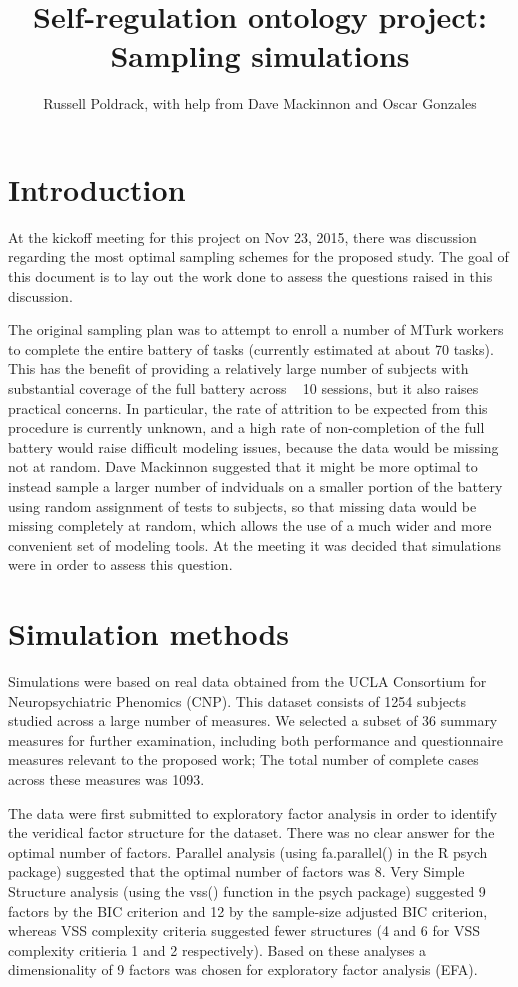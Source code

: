\documentclass[11pt, oneside]{article}   	%
\title{Self-regulation ontology project: Sampling simulations}
\author{Russell Poldrack, with help from Dave Mackinnon and Oscar Gonzales}
\begin{document}
\maketitle
\section{Introduction}
At the kickoff meeting for this project on Nov 23, 2015, there was discussion regarding the most optimal sampling schemes for the proposed study.  The goal of this document is to lay out the work done to assess the questions raised in this discussion.

The original sampling plan was to attempt to enroll a number of MTurk workers to complete the entire battery of tasks (currently estimated at about 70 tasks).  This has the benefit of providing a relatively large number of subjects with substantial coverage of the full battery across ~ 10 sessions, but it also raises practical concerns.  In particular, the rate of attrition to be expected from this procedure is currently unknown, and a  high rate of non-completion of the full battery would raise difficult modeling issues, because the data would be missing not at random.  Dave Mackinnon suggested that it might be more optimal to instead sample a larger number of indviduals on a smaller portion of the battery using random assignment of tests to subjects, so that missing data would be missing completely at random, which allows the use of a much wider and more convenient set of modeling tools.  At the meeting it was decided that simulations were in order to assess this question.

\section{Simulation methods}
Simulations were based on real data obtained from the UCLA Consortium for Neuropsychiatric Phenomics (CNP).  This dataset consists of 1254 subjects studied across a large number of measures.  We selected a subset of 36 summary measures for further examination, including both performance and questionnaire measures relevant to the proposed work; The total number of complete cases across these measures was 1093.  

The data were first submitted to exploratory factor analysis in order to identify the veridical factor structure for the dataset.  There was no clear answer for the optimal number of factors.  Parallel analysis (using fa.parallel() in the R psych package) suggested that the optimal number of factors was 8. Very Simple Structure analysis (using the vss() function in the psych package) suggested 9 factors by the BIC criterion and 12  by the sample-size adjusted BIC criterion, whereas VSS complexity criteria suggested fewer structures (4 and 6 for VSS complexity critieria 1 and 2 respectively).  Based on these analyses a dimensionality of 9 factors was chosen for exploratory factor analysis (EFA).  
\end{document}
